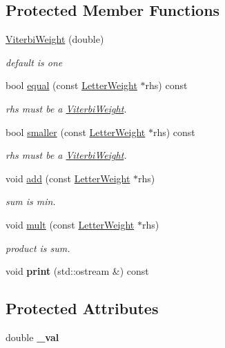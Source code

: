\subsection*{Protected Member Functions}
\begin{DoxyCompactItemize}
\item 
\mbox{\hyperlink{group__weight_gaf4e626612999673b8e4e0a322119402c}{Viterbi\+Weight}} (double)
\begin{DoxyCompactList}\small\item\em default is one \end{DoxyCompactList}\item 
bool \mbox{\hyperlink{group__weight_ga96f4c23e4845b232451e99b648bddfd6}{equal}} (const \mbox{\hyperlink{classLetterWeight}{Letter\+Weight}} $\ast$rhs) const
\begin{DoxyCompactList}\small\item\em rhs must be a \mbox{\hyperlink{classViterbiWeight}{Viterbi\+Weight}}. \end{DoxyCompactList}\item 
bool \mbox{\hyperlink{group__weight_ga54f4048f888a9432f02bc0d9f25257c1}{smaller}} (const \mbox{\hyperlink{classLetterWeight}{Letter\+Weight}} $\ast$rhs) const
\begin{DoxyCompactList}\small\item\em rhs must be a \mbox{\hyperlink{classViterbiWeight}{Viterbi\+Weight}}. \end{DoxyCompactList}\item 
void \mbox{\hyperlink{group__weight_ga009b0216c58308f81497e4aabe49aaed}{add}} (const \mbox{\hyperlink{classLetterWeight}{Letter\+Weight}} $\ast$rhs)
\begin{DoxyCompactList}\small\item\em sum is min. \end{DoxyCompactList}\item 
void \mbox{\hyperlink{group__weight_ga842377ca8ad5fa73cc9787fa97e88635}{mult}} (const \mbox{\hyperlink{classLetterWeight}{Letter\+Weight}} $\ast$rhs)
\begin{DoxyCompactList}\small\item\em product is sum. \end{DoxyCompactList}\item 
void {\bfseries print} (std\+::ostream \&) const
\end{DoxyCompactItemize}
\subsection*{Protected Attributes}
\begin{DoxyCompactItemize}
\item 
\mbox{\label{classViterbiWeight_a0e70b1bda371ba1887ea71e5ff5f91bf}} 
double {\bfseries \+\_\+val}
\end{DoxyCompactItemize}

